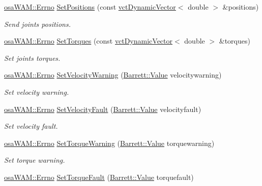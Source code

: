 \begin{DoxyCompactItemize}
\hyperlink{classosa_w_a_m_aff15893cc52d67e46cb66de794109f9e}{osa\-W\-A\-M\-::\-Errno} \hyperlink{classosa_w_a_m_a1bd84ef3de2b32939d9120ed27470b5c}{Set\-Positions} (const \hyperlink{classvct_dynamic_vector}{vct\-Dynamic\-Vector}$<$ double $>$ \&positions)
\begin{DoxyCompactList}\small\item\em Send joints positions. \end{DoxyCompactList}\item 
\hyperlink{classosa_w_a_m_aff15893cc52d67e46cb66de794109f9e}{osa\-W\-A\-M\-::\-Errno} \hyperlink{classosa_w_a_m_a28246d128d27d1c56ddbea80395e872a}{Set\-Torques} (const \hyperlink{classvct_dynamic_vector}{vct\-Dynamic\-Vector}$<$ double $>$ \&torques)
\begin{DoxyCompactList}\small\item\em Set joints torques. \end{DoxyCompactList}\item 
\hyperlink{classosa_w_a_m_aff15893cc52d67e46cb66de794109f9e}{osa\-W\-A\-M\-::\-Errno} \hyperlink{classosa_w_a_m_a465f0046f44ba8e7d56bd8817318a9a9}{Set\-Velocity\-Warning} (\hyperlink{struct_barrett_a57ff132885344ca62e4b4b691885685b}{Barrett\-::\-Value} velocitywarning)
\begin{DoxyCompactList}\small\item\em Set velocity warning. \end{DoxyCompactList}\item 
\hyperlink{classosa_w_a_m_aff15893cc52d67e46cb66de794109f9e}{osa\-W\-A\-M\-::\-Errno} \hyperlink{classosa_w_a_m_a069bfa259430cb2d01b71f63a89f353b}{Set\-Velocity\-Fault} (\hyperlink{struct_barrett_a57ff132885344ca62e4b4b691885685b}{Barrett\-::\-Value} velocityfault)
\begin{DoxyCompactList}\small\item\em Set velocity fault. \end{DoxyCompactList}\item 
\hyperlink{classosa_w_a_m_aff15893cc52d67e46cb66de794109f9e}{osa\-W\-A\-M\-::\-Errno} \hyperlink{classosa_w_a_m_a3242d281674710f9a0a277f833660b2d}{Set\-Torque\-Warning} (\hyperlink{struct_barrett_a57ff132885344ca62e4b4b691885685b}{Barrett\-::\-Value} torquewarning)
\begin{DoxyCompactList}\small\item\em Set torque warning. \end{DoxyCompactList}\item 
\hyperlink{classosa_w_a_m_aff15893cc52d67e46cb66de794109f9e}{osa\-W\-A\-M\-::\-Errno} \hyperlink{classosa_w_a_m_a0dd7b8486a6b041d794876c3faa062a2}{Set\-Torque\-Fault} (\hyperlink{struct_barrett_a57ff132885344ca62e4b4b691885685b}{Barrett\-::\-Value} torquefault)

\end{DoxyCompactItemize}
